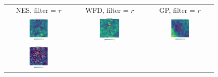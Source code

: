\documentclass[preprintm,linenumbers]{aastex631}
\begin{document}
  
  	\begin{figure}
			\centering
			\begin{tabular}{  c c c}
                 NES, filter = $r$ & WFD, filter = $r$ & GP, filter = $r$ \\
				\includegraphics[width=0.3\textwidth]{results/skymaps_cutout/skymaps_cutout_first_year_one_snap_v4_0_10yrs_db_noDD_noTwi_nside-256_CountMetric_r_NES_noDD_noTwi.pdf} &
				\includegraphics[width=0.3\textwidth]{results/skymaps_cutout/skymaps_cutout_first_year_one_snap_v4_0_10yrs_db_noDD_noTwi_nside-256_CountMetric_r_WFD_noDD_noTwi.pdf} &
				\includegraphics[width=0.3\textwidth]{results/skymaps_cutout/skymaps_cutout_first_year_one_snap_v4_0_10yrs_db_noDD_noTwi_nside-256_CountMetric_r_GP_noDD_noTwi.pdf} \\
				\includegraphics[width=0.3\textwidth]{results/skymaps_cutout/skymaps_cutout_first_year_one_snap_v4_0_10yrs_db_noDD_noTwi_tscale-7_nside-256_doAllTemplateMetrics_reduceCount_r_NES_noDD_noTwi.pdf} &

\end{tabular}
\end{figure}
\end{document}
